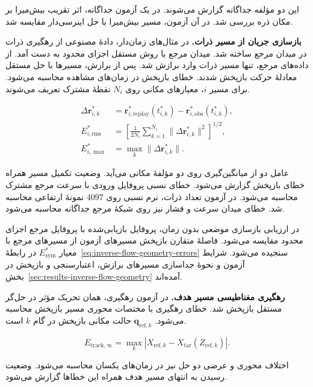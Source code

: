 این دو مؤلفه جداگانه گزارش می‌شوند.
در یک آزمون جداگانه، اثر تقریب بیش‌میرا بر مکان ذره بررسی شد.
در آن آزمون، مسیر بیش‌میرا با حل اینرسی‌دار  مقایسه شد.

\textbf{بازسازی جریان از مسیر ذرات.}
در مثال‌های زمان‌دار، دادهٔ مصنوعی از رهگیری ذرات در میدان مرجع ساخته شد.
میدان مرجع با روش مستقل اجزای محدود به دست آمد.
از داده‌های مرجع، تنها مسیر ذرات وارد برازش شد.
پس از برازش، مسیرها با حل مستقل معادلهٔ حرکت بازپخش شدند.
خطای بازپخش در زمان‌های مشاهده محاسبه می‌شود.
برای مسیر $i$، معیارهای مکانی روی $N_i$ نقطهٔ مشترک تعریف می‌شوند.

\begin{equation}
\begin{aligned}
\Delta\mathbf r_{i,k}^*
&=\mathbf r_{i,\mathrm{replay}}^*(t_{i,k}^*)
 -\mathbf r_{i,\mathrm{obs}}^*(t_{i,k}^*),\\
E_{i,\mathrm{rms}}^*
&=\left[\frac1{2N_i}\sum_{k=1}^{N_i}
 \|\Delta\mathbf r_{i,k}^*\|^2\right]^{1/2},\\
E_{i,\max}^*&=\max_k\|\Delta\mathbf r_{i,k}^*\|.
\end{aligned}
\label{eq:validation-inverse-timed-path}
\end{equation}

عامل دو از میانگین‌گیری روی دو مؤلفهٔ مکانی می‌آید.
وضعیت تکمیل مسیر همراه خطای بازپخش گزارش می‌شود.
خطای نسبی پروفایل ورودی با سرعت مرجع مشترک محاسبه می‌شود.
در آزمون تعداد ذرات، نرم نسبی روی $4097$ نمونهٔ ارتفاعی محاسبه شد.
خطای میدان سرعت و فشار نیز روی شبکهٔ مرجع جداگانه محاسبه می‌شود.

در ارزیابی بازسازی موضعی بدون زمان، پروفایل بازیابی‌شده با پروفایل مرجع اجزای محدود مقایسه می‌شود.
فاصلهٔ متقارن بازپخش مسیرهای آزمون از مسیرهای مرجع با معیار $E_{\mathrm{sym}}^*$ در رابطهٔ~\eqref{eq:inverse-flow-geometry-errors} سنجیده می‌شود.
شرایط آزمون و نحوهٔ جداسازی مسیرهای برازش، اعتبارسنجی و بازپخش در بخش~\ref{sec:results-inverse-flow-geometry} آمده‌اند.

\textbf{رهگیری مغناطیسی مسیر هدف.}
در آزمون رهگیری، همان تحریک مؤثر در حل‌گر مستقل  بازپخش شد.
خطای رهگیری با مختصات محوری مسیر بازپخش محاسبه می‌شود.
$\mathbf q_{\mathrm{ref},k}$ حالت مکانی بازپخش در گام $k$ است.

\begin{equation}
E_{\mathrm{track},\infty}
=\max_k
 |X_{\mathrm{ref},k}-X_{\mathrm{tar}}(Z_{\mathrm{ref},k})|.
\label{eq:validation-master9-tracking}
\end{equation}

اختلاف محوری و عرضی دو حل نیز در زمان‌های یکسان محاسبه می‌شود.
وضعیت رسیدن به انتهای مسیر هدف همراه این خطاها گزارش می‌شود.

